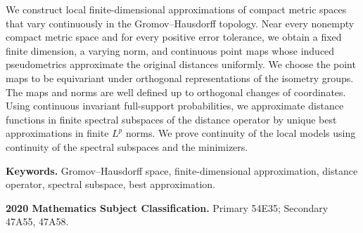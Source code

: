 We construct local finite-dimensional approximations of compact metric spaces that vary continuously in the Gromov--Hausdorff topology. Near every nonempty compact metric space and for every positive error tolerance, we obtain a fixed finite dimension, a varying norm, and continuous point maps whose induced pseudometrics approximate the original distances uniformly. We choose the point maps to be equivariant under orthogonal representations of the isometry groups. The maps and norms are well defined up to orthogonal changes of coordinates. Using continuous invariant full-support probabilities, we approximate distance functions in finite spectral subspaces of the distance operator by unique best approximations in finite $L^p$ norms. We prove continuity of the local models using continuity of the spectral subspaces and the minimizers.

\par\smallskip
\noindent\textbf{Keywords.} Gromov--Hausdorff space, finite-dimensional approximation, distance operator, spectral subspace, best approximation.

\par\smallskip
\noindent\textbf{2020 Mathematics Subject Classification.} Primary 54E35; Secondary 47A55, 47A58.
